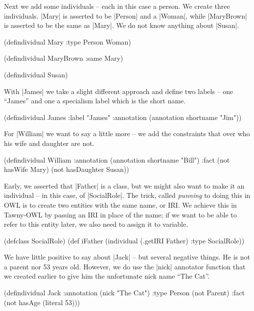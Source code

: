 Next we add some individuals -- each in this case a person. We create
three individuals. |Mary| is asserted to be |Person| and a |Woman|,
while |MaryBrown| is asserted to be the same as |Mary|. We do not know
anything about |Susan|.

\begin{tawny}
(defindividual Mary
  :type Person Woman)

(defindividual MaryBrown
  :same Mary)

(defindividual Susan)
\end{tawny}

With |James| we take a slight different approach and define two labels
-- one ``James'' and one a specialism label which is the short name.

\begin{tawny}
(defindividual James
  :label "James"
  :annotation (annotation shortname "Jim"))
\end{tawny}

For |William| we want to say a little more -- we add the constraints
that over who his wife and daughter are not.

\begin{tawny}
(defindividual William
  :annotation (annotation shortname "Bill")
  :fact
  (not hasWife Mary)
  (not hasDaughter Susan))
\end{tawny}

Early, we asserted that |Father| is a class, but we might also want to
make it an individual -- in this case, of |SocialRole|. The trick,
called \emph{punning} to doing this in OWL is to create two entities
with the same name, or IRI. We achieve this in Tawny-OWL by passing an
IRI in place of the name; if we want to be able to refer to this
entity later, we also need to assign it to variable.

\begin{tawny}
(defclass SocialRole)
(def iFather
  (individual (.getIRI Father)
              :type SocialRole))
\end{tawny}

We have little positive to say about |Jack| -- but several negative
things. He is not a parent nor 53 years old. However, we do use the
|nick| annotator function that we created earlier to give him the
unfortunate nick name ``The Cat''.

\begin{tawny}
(defindividual Jack
  :annotation (nick "The Cat")
  :type Person (not Parent)
  :fact (not hasAge (literal 53)))
\end{tawny}

